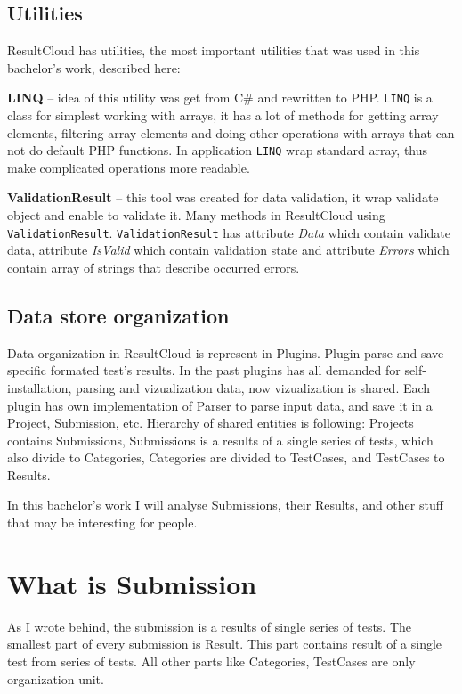 \subsection{Utilities}

ResultCloud has utilities, the most important utilities that was used in this bachelor's work, described here:

\textbf{LINQ} -- idea of this utility was get from C\# and rewritten to PHP. \texttt{LINQ} is a class for simplest working with arrays, it has a lot of methods for getting array elements, filtering array elements and doing other operations with arrays that can not do default PHP functions. In application \texttt{LINQ} wrap standard array, thus make complicated operations more readable.  

\textbf{ValidationResult} -- this tool was created for data validation, it wrap validate object and enable to validate it. Many methods in ResultCloud using \texttt{ValidationResult}. \texttt{ValidationResult} has attribute \emph{Data} which contain validate data, attribute \emph{IsValid} which contain validation state and attribute \emph{Errors} which contain array of strings that describe occurred errors.

\subsection{Data store organization}

Data organization in ResultCloud is represent in Plugins. Plugin parse and save specific formated test's results. In the past plugins has all demanded for self-installation, parsing and vizualization data, now vizualization is shared. 
Each plugin has own implementation of Parser to parse input data, and save it in a Project, Submission, etc. Hierarchy of shared entities is following: Projects  contains Submissions, Submissions is a results of a single series of tests, which also divide to Categories, Categories are divided to TestCases, and TestCases to Results.

In this bachelor's work I will analyse Submissions, their Results, and other stuff that may be interesting for people.

\section{What is Submission}

As I wrote behind, the submission is a results of single series of tests. The smallest part of every submission is Result. This part contains result of a single test from series of tests. All other parts like Categories, TestCases are only organization unit. 

